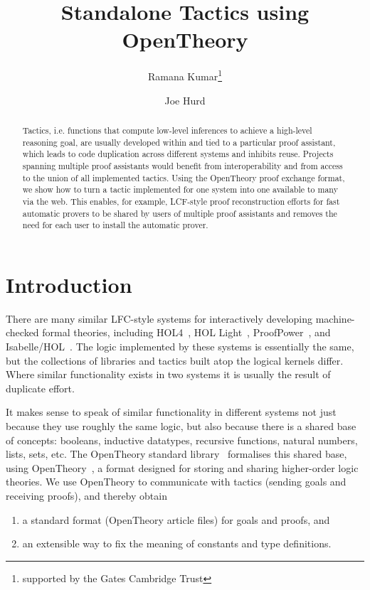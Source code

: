 \documentclass{llncs}
\newcommand{\OpenTheory}{OpenTheory\xspace}
\newcommand{\ie}{i.e.\xspace}
\begin{document}
\title{Standalone Tactics using OpenTheory}

\author{Ramana Kumar\thanks{supported by the Gates Cambridge Trust}\and Joe Hurd}


\maketitle

\begin{abstract}
Tactics, \ie functions that compute low-level inferences to achieve a high-level reasoning goal, are usually developed within and tied to a particular proof assistant, which leads to code duplication across different systems and inhibits reuse.
Projects spanning multiple proof assistants would benefit from interoperability and from access to the union of all implemented tactics.
Using the OpenTheory proof exchange format, we show how to turn a tactic implemented for one system into one available to many via the web.
This enables, for example, LCF-style proof reconstruction efforts for fast automatic provers to be shared by users of multiple proof assistants and removes the need for each user to install the automatic prover.
\end{abstract}

\section{Introduction}
There are many similar LFC-style systems for interactively developing machine-checked formal theories, including HOL4~\cite{slind08brief}, HOL Light~\cite{DBLP:conf/tphol/Harrison09a}, ProofPower~\cite{ProofPower}, and Isabelle/HOL~\cite{wenzel08isabelle}.
The logic implemented by these systems is essentially the same, but the collections of libraries and tactics built atop the logical kernels differ.
Where similar functionality exists in two systems it is usually the result of duplicate effort.

It makes sense to speak of similar functionality in different systems not just because they use roughly the same logic, but also because there is a shared base of concepts: booleans, inductive datatypes, recursive functions, natural numbers, lists, sets, etc.  
The \OpenTheory standard library~\cite{DBLP:conf/nfm/Hurd11} formalises this shared base, using \OpenTheory~\cite{hurd2009}, a format designed for storing and sharing higher-order logic theories.
We use \OpenTheory to communicate with tactics (sending goals and receiving proofs), and thereby obtain
\begin{enumerate}
\item
a standard format (\OpenTheory article files) for goals and proofs, and
\item
an extensible way to fix the meaning of constants and type definitions.
\end{enumerate}
\end{document}
